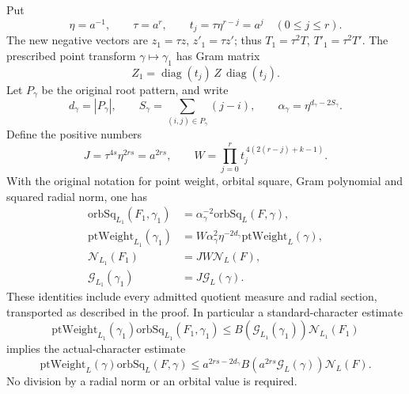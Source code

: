 \begin{proposition}
Put
\[
 \eta=a^{-1},\qquad \tau=a^r,\qquad
 t_j=\tau\eta^{r-j}=a^j\quad(0\le j\le r).
                                                        \tag{CT1}
\]
The new negative vectors are \(z_1=\tau z\), \(z'_1=\tau z'\);
thus \(T_1=\tau^2T\), \(T'_1=\tau^2T'\).
The prescribed point transform \(\gamma\mapsto\gamma_1\)
has Gram matrix
\[
       Z_1=\operatorname{diag}(t_j)\,
                       Z\,\operatorname{diag}(t_j).
                                                        \tag{CT2}
\]
Let \(P_\gamma\) be the original root pattern, and write
\[
 d_\gamma=|P_\gamma|,\qquad
 S_\gamma=\sum_{(i,j)\in P_\gamma}(j-i),\qquad
 \alpha_\gamma=\eta^{d_\gamma-2S_\gamma}.
\]
Define the positive numbers
\[
 J=\tau^{4s}\eta^{2rs}=a^{2rs},\qquad
 W=\prod_{j=0}^r
        t_j^{\,4(2(r-j)+k-1)} .
                                                        \tag{CT3}
\]
With the original notation for point weight, orbital square,
Gram polynomial and squared radial norm, one has
\begin{align}
 \mathrm{orbSq}_{L_1}(F_1,\gamma_1)
      &=\alpha_\gamma^{-2}
                         \mathrm{orbSq}_L(F,\gamma),
                                                        \label{eq:character-orb}\\
 \mathrm{ptWeight}_{L_1}(\gamma_1)
      &=W\alpha_\gamma^2\eta^{-2d_\gamma}
                             \mathrm{ptWeight}_L(\gamma),
                                                        \label{eq:character-weight}\\
 \mathcal N_{L_1}(F_1)&=JW\mathcal N_L(F),
                                                        \label{eq:character-norm}\\
 \mathcal G_{L_1}(\gamma_1)&=J\mathcal G_L(\gamma).
                                                        \label{eq:character-gram}
\end{align}
These identities include every admitted quotient measure
and radial section, transported as described in the proof.
In particular a standard-character estimate
\[
 \mathrm{ptWeight}_{L_1}(\gamma_1)
       \mathrm{orbSq}_{L_1}(F_1,\gamma_1)
 \le B(\mathcal G_{L_1}(\gamma_1))\mathcal N_{L_1}(F_1)
\]
implies the actual-character estimate
\[
 \mathrm{ptWeight}_L(\gamma)\mathrm{orbSq}_L(F,\gamma)
 \le a^{2rs-2d_\gamma}
               B(a^{2rs}\mathcal G_L(\gamma))\mathcal N_L(F).
                                                        \tag{CT4}
\]
No division by a radial norm or an orbital value is required.
\end{proposition}

